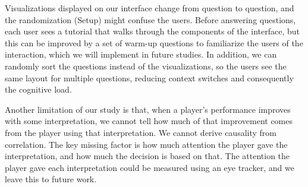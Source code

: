 Visualizations displayed on our interface change from question to
question, and the randomization (Setup)
might confuse the users. Before answering questions, each user sees
a tutorial that walks through the components of the interface,
but this can be improved by a set of warm-up questions to familiarize
the users of the interaction, which we will implement in future
studies. In addition, we can randomly sort the questions instead of
the visualizations, so the users see the same layout for multiple
questions, reducing context switches and consequently the cognitive
load.

Another limitation of our study is that, when a player's performance
improves with some interpretation, we cannot tell how much of that
improvement comes from the player using that interpretation.
We cannot derive causality from correlation. The key
missing factor is how much attention the player gave the interpretation,
and how much the decision is based on that. The attention the player
gave each interpretation could be measured using an eye tracker, and we
leave this to future work.


%
%
%

